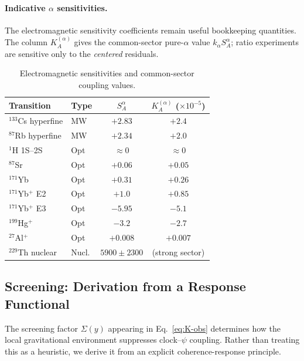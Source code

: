 \paragraph{Indicative $\alpha$ sensitivities.}
The electromagnetic sensitivity coefficients remain useful bookkeeping quantities.  The column $K_A^{(\alpha)}$ gives the common-sector pure-$\alpha$ value $k_\alpha S_A^\alpha$; ratio experiments are sensitive only to the \emph{centered} residuals.
\begin{table}[h]
\centering
\caption{Electromagnetic sensitivities and common-sector coupling values.}
\label{tab:alpha-sens}
\renewcommand{\arraystretch}{1.15}
\small
\begin{tabular}{@{}llcc@{}}
\toprule
Transition & Type & $S_A^\alpha$ & $K_A^{(\alpha)}$ ($\times 10^{-5}$) \\
\midrule
$^{133}$Cs hyperfine & MW & $+2.83$ & $+2.4$ \\
$^{87}$Rb hyperfine & MW & $+2.34$ & $+2.0$ \\
$^{1}$H 1S--2S & Opt & $\approx 0$ & $\approx 0$ \\
$^{87}$Sr & Opt & $+0.06$ & $+0.05$ \\
$^{171}$Yb & Opt & $+0.31$ & $+0.26$ \\
$^{171}$Yb$^+$ E2 & Opt & $+1.0$ & $+0.85$ \\
$^{171}$Yb$^+$ E3 & Opt & $-5.95$ & $-5.1$ \\
$^{199}$Hg$^+$ & Opt & $-3.2$ & $-2.7$ \\
$^{27}$Al$^+$ & Opt & $+0.008$ & $+0.007$ \\
$^{229}$Th nuclear~\cite{Beeks2025} & Nucl. & $5900\pm2300$ & (strong sector) \\
\bottomrule
\end{tabular}
\end{table}

\subsection{Screening: Derivation from a Response Functional}\label{sec:clocks-regime}

The screening factor $\Sigma(y)$ appearing in Eq.~\eqref{eq:K-obs} determines how the local gravitational environment suppresses clock--$\psi$ coupling.  Rather than treating this as a heuristic, we derive it from an explicit coherence-response principle.

